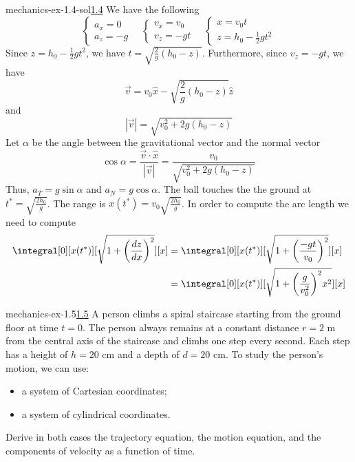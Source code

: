 \documentclass[preview]{standalone}
\begin{document}
\begin{snippetsolution}{mechanics-ex-1.4-sol}{\underline{1.4}}
    We have the following
    \[
        \begin{cases}
            a_x = 0 \\
            a_z = -g
        \end{cases} \quad
        \begin{cases}
            v_x = v_0 \\
            v_z = -gt
        \end{cases} \quad
        \begin{cases}
            x = v_0t \\
            z = h_0 - \frac{1}{2}gt^2
        \end{cases}
    \]
    Since \(z = h_0 - \frac{1}{2}gt^2\), we have \(t = \sqrt{\frac{2}{g}(h_0-z)}\).
    Furthermore, since \(v_z = -gt\), we have
    \[
        \vec{v} = v_0 \hat{x} - \sqrt{\frac{2}{g}(h_0-z)} \hat{z}
    \]
    and
    \[
        |\vec{v}| = \sqrt{v_0^2 + 2g(h_0 - z)}
    \]
    Let \(\alpha\) be the angle between the gravitational vector and the normal vector
    \[
        \cos\alpha = \frac{\vec{v} \cdot \hat{x}}{|\vec{v}|}
        = \frac{v_0}{\sqrt{v_0^2 + 2g(h_0 - z)}}
    \]
    Thus, \(a_T = g\sin\alpha\) and \(a_N = g\cos\alpha\).
    The ball touches the the ground at \(t^* = \sqrt{\frac{2h_0}{g}}\).
    The range is \(x(t^*) = v_0 \sqrt{\frac{2h_0}{g}}\).
    In order to compute the arc length we need to compute
    \begin{align*}
        \integral[0][x(t^*)][\sqrt{1 + {\left(\frac{dz}{dx}\right)}^2}][x]
        &= \integral[0][x(t^*)][\sqrt{1 + {\left(\frac{-gt}{v_0}\right)}^2}][x] \\
        &= \integral[0][x(t^*)][\sqrt{1 + {\left(\frac{g}{v_0^2}\right)}^2x^2}][x]
    \end{align*}
\end{snippetsolution}

\begin{snippetexercise}{mechanics-ex-1.5}{\underline{1.5}}
    A person climbs a spiral staircase starting from the ground floor at time \( t = 0 \). The person always remains at a constant distance \( r = 2 \) m from the central axis of the staircase and climbs one step every second. Each step has a height of \( h = 20 \) cm and a depth of \( d = 20 \) cm. To study the person's motion, we can use:
    \begin{itemize}
        \item a system of Cartesian coordinates;
        \item a system of cylindrical coordinates.
    \end{itemize}
    Derive in both cases the trajectory equation, the motion equation, and the components of velocity as a function of time.
\end{snippetexercise}
\end{document}
